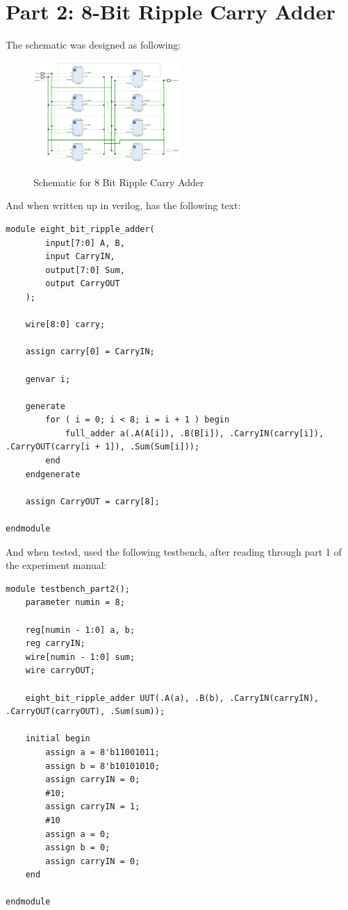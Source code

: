 \section{Part 2: 8-Bit Ripple Carry Adder}
The schematic was designed as following:
\begin{figure}[!htbp]
    \centering
    \caption{Schematic for 8 Bit Ripple Carry Adder}
    \includegraphics[width=0.5\textwidth]{part-2-schem.png}
    \label{8 Bit Ripple Carry Schematic}
\end{figure}

And when written up in verilog, has the following text:
\begin{lstlisting}[label={label}, style=Verilog]
module eight_bit_ripple_adder(
        input[7:0] A, B, 
        input CarryIN,
        output[7:0] Sum, 
        output CarryOUT
    );
    
    wire[8:0] carry;
    
    assign carry[0] = CarryIN;
    
    genvar i;
    
    generate
        for ( i = 0; i < 8; i = i + 1 ) begin
            full_adder a(.A(A[i]), .B(B[i]), .CarryIN(carry[i]), .CarryOUT(carry[i + 1]), .Sum(Sum[i]));
        end
    endgenerate
    
    assign CarryOUT = carry[8];
    
endmodule
\end{lstlisting}

And when tested, used the following testbench, after reading through part 1 of the experiment manual:
\begin{lstlisting}[label={label}, style=Verilog]
module testbench_part2();
    parameter numin = 8;
    
    reg[numin - 1:0] a, b;
    reg carryIN;
    wire[numin - 1:0] sum;
    wire carryOUT;
    
    eight_bit_ripple_adder UUT(.A(a), .B(b), .CarryIN(carryIN), .CarryOUT(carryOUT), .Sum(sum));
    
    initial begin
        assign a = 8'b11001011;
        assign b = 8'b10101010;
        assign carryIN = 0;
        #10;
        assign carryIN = 1;
        #10
        assign a = 0;
        assign b = 0;
        assign carryIN = 0;
    end
    
endmodule
\end{lstlisting}

